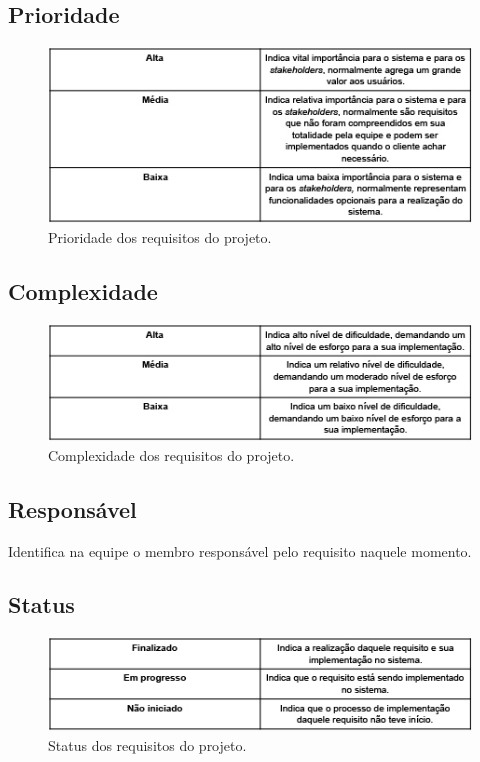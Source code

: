 \subsection{Prioridade}
  \begin{figure}[!htbp]
    \centering
    \includegraphics[scale=0.5]{figuras/tabela_prioridade}
    \caption[Prioridade dos requisitos do projeto.]{Prioridade dos requisitos do projeto. \footnotemark}
    \label{tabela_prioridade}
  \end{figure}
\subsection{Complexidade}
  \begin{figure}[!htbp]
    \centering
    \includegraphics[scale=0.5]{figuras/tabela_complexidade}
    \caption[Complexidade dos requisitos do projeto.]{Complexidade dos requisitos do projeto. \footnotemark}
    \label{tabela_complexidade}
  \end{figure}
\subsection{Responsável}
Identifica na equipe o membro responsável pelo requisito naquele momento.
\subsection{Status}
  \begin{figure}[!htbp]
    \centering
    \includegraphics[scale=0.5]{figuras/tabela_status}
    \caption[Status dos requisitos do projeto.]{Status dos requisitos do projeto. \footnotemark}
    \label{tabela_status}
  \end{figure}
